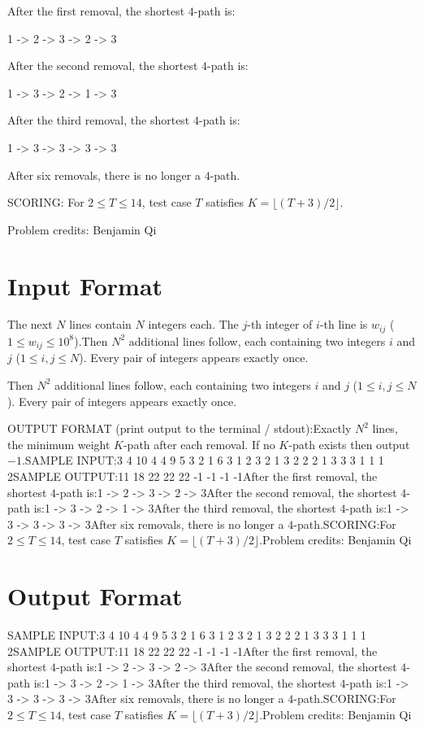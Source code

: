 \documentclass[12pt]{article}
\begin{document}
After the first removal, the shortest $4$-path is:


1 -> 2 -> 3 -> 2 -> 3

After the second removal, the shortest $4$-path is:


1 -> 3 -> 2 -> 1 -> 3

After the third removal, the shortest $4$-path is:


1 -> 3 -> 3 -> 3 -> 3

After six removals, there is no longer a $4$-path.

SCORING:
For $2\le T\le 14$, test case $T$ satisfies $K=\lfloor (T+3)/2\rfloor$. 



Problem credits: Benjamin Qi



\section*{Input Format}
The next $N$ lines contain $N$ integers each. The $j$-th integer of $i$-th line
is $w_{ij}$ ($1\le w_{ij}\le 10^8$).Then $N^2$ additional lines follow, each containing two integers $i$ and $j$
($1\le i,j\le N$). Every pair of integers appears exactly once.

Then $N^2$ additional lines follow, each containing two integers $i$ and $j$
($1\le i,j\le N$). Every pair of integers appears exactly once.

OUTPUT FORMAT (print output to the terminal / stdout):Exactly $N^2$ lines, the minimum weight $K$-path after each removal.  If no $K$-path
exists then output $-1$.SAMPLE INPUT:3 4
10 4 4
9 5 3
2 1 6
3 1
2 3
2 1
3 2
2 2
1 3
3 3
1 1
1 2SAMPLE OUTPUT:11
18
22
22
22
-1
-1
-1
-1After the first removal, the shortest $4$-path is:1 -> 2 -> 3 -> 2 -> 3After the second removal, the shortest $4$-path is:1 -> 3 -> 2 -> 1 -> 3After the third removal, the shortest $4$-path is:1 -> 3 -> 3 -> 3 -> 3After six removals, there is no longer a $4$-path.SCORING:For $2\le T\le 14$, test case $T$ satisfies $K=\lfloor (T+3)/2\rfloor$.Problem credits: Benjamin Qi

\section*{Output Format}
SAMPLE INPUT:3 4
10 4 4
9 5 3
2 1 6
3 1
2 3
2 1
3 2
2 2
1 3
3 3
1 1
1 2SAMPLE OUTPUT:11
18
22
22
22
-1
-1
-1
-1After the first removal, the shortest $4$-path is:1 -> 2 -> 3 -> 2 -> 3After the second removal, the shortest $4$-path is:1 -> 3 -> 2 -> 1 -> 3After the third removal, the shortest $4$-path is:1 -> 3 -> 3 -> 3 -> 3After six removals, there is no longer a $4$-path.SCORING:For $2\le T\le 14$, test case $T$ satisfies $K=\lfloor (T+3)/2\rfloor$.Problem credits: Benjamin Qi
\end{document}
